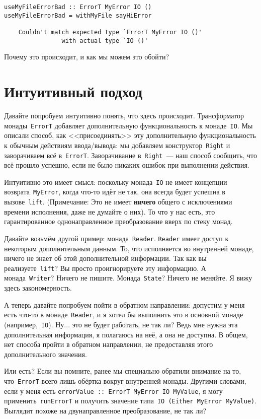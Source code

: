 \begin{lstlisting}
useMyFileErrorBad :: ErrorT MyError IO ()
useMyFileErrorBad = withMyFile sayHiError

    Couldn't match expected type `ErrorT MyError IO ()'
                with actual type `IO ()'
\end{lstlisting}

Почему это происходит, и как мы можем это обойти?

\section{Интуитивный подход}
Давайте попробуем интуитивно понять, что здесь происходит. Трансформатор
монады~\lstinline'ErrorT' добавляет дополнительную функциональность к
монаде~\lstinline'IO'.  Мы описали способ, как <<присоединять>> эту
дополнительную функциональность к обычным действиям ввода/вывода: мы добавляем
конструктор~\lstinline'Right' и заворачиваем всё в~\lstinline'ErrorT'.
Заворачивание в~\lstinline'Right'~--- наш способ сообщить, что всё прошло успешно,
если не было никаких ошибок при выполнении действия.

Интуитивно это имеет смысл: поскольку монада~\lstinline'IO' не имеет концепции
возврата~\lstinline'MyError', когда что-то идёт не так, она всегда будет
успешна в вызове~\lstinline'lift'.  (Примечание: Это не имеет \textbf{ничего}
общего с исключениями времени исполнения, даже не думайте о них). То что у нас
есть, это гарантированное однонаправленное преобразование вверх по стеку монад.

Давайте возьмём другой пример: монада~\lstinline'Reader'. \lstinline'Reader'
имеет доступ к некоторым дополнительным данным. То, что исполняется во
внутренней монаде, ничего не знает об этой дополнительной информации. Так как вы
реализуете~\lstinline'lift'? Вы просто проигнорируете эту информацию. А
монада~\lstinline'Writer'? Ничего не пишите. Монада~\lstinline'State'?  Ничего
не меняйте. Я вижу здесь закономерность.

А теперь давайте попробуем пойти в обратном направлении: допустим у меня есть
что-то в монаде~\lstinline'Reader', и я хотел бы выполнить это в основной
монаде (например,~\lstinline'IO'). Ну... это не будет работать, не так ли? Ведь
мне нужна эта дополнительная информация, я полагаюсь на неё, а она не доступна.
В общем, нет способа пройти в обратном направлении, не предоставляя этого
дополнительного значения.

Или есть? Если вы помните, ранее мы специально обратили внимание на то,
что~\lstinline'ErrorT' всего лишь обёртка вокруг внутренней монады. Другими
словами, если у меня есть \lstinline'errorValue :: ErrorT MyError IO MyValue',
я могу применить~\lstinline'runErrorT' и получить значение
типа~\lstinline'IO (Either MyError MyValue)'. Выглядит похоже на
двунаправленное преобразование, не так ли?

